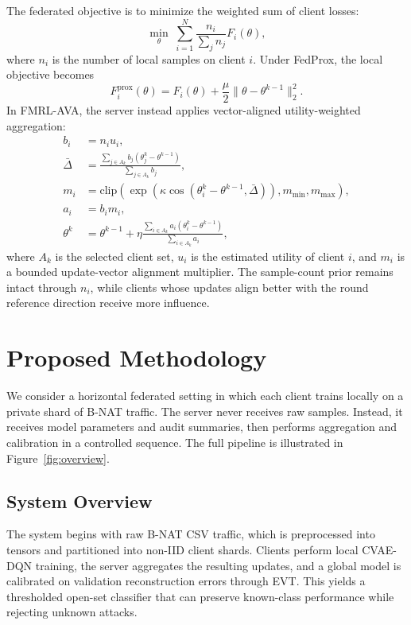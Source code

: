 \documentclass[10pt,twocolumn]{article}
\begin{document}
The federated objective is to minimize the weighted sum of client losses:
\[
\min_{\theta}\; \sum_{i=1}^{N} \frac{n_i}{\sum_j n_j} F_i(\theta),
\]
where $n_i$ is the number of local samples on client $i$. Under FedProx, the local objective becomes
\[
F_i^{\mathrm{prox}}(\theta) = F_i(\theta) + \frac{\mu}{2}\lVert \theta - \theta^{k-1}\rVert_2^2.
\]
In FMRL-AVA, the server instead applies vector-aligned utility-weighted aggregation:
\[
\begin{aligned}
b_i &= n_i u_i,\\
\bar{\Delta} &= \frac{\sum_{j \in A_k} b_j(\theta_j^k - \theta^{k-1})}{\sum_{j \in A_k} b_j},\\
m_i &= \mathrm{clip}\!\left(\exp(\kappa \cos(\theta_i^k-\theta^{k-1}, \bar{\Delta})), m_{\min}, m_{\max}\right),\\
a_i &= b_i m_i,\\
\theta^{k} &= \theta^{k-1} + \eta \frac{\sum_{i \in A_k} a_i(\theta_i^k - \theta^{k-1})}{\sum_{i \in A_k} a_i},
\end{aligned}
\]
where $A_k$ is the selected client set, $u_i$ is the estimated utility of client $i$, and $m_i$ is a bounded update-vector alignment multiplier. The sample-count prior remains intact through $n_i$, while clients whose updates align better with the round reference direction receive more influence.

\section{Proposed Methodology}
We consider a horizontal federated setting in which each client trains locally on a private shard of B-NAT traffic. The server never receives raw samples. Instead, it receives model parameters and audit summaries, then performs aggregation and calibration in a controlled sequence. The full pipeline is illustrated in Figure~\ref{fig:overview}.

\subsection{System Overview}
The system begins with raw B-NAT CSV traffic, which is preprocessed into tensors and partitioned into non-IID client shards. Clients perform local CVAE-DQN training, the server aggregates the resulting updates, and a global model is calibrated on validation reconstruction errors through EVT. This yields a thresholded open-set classifier that can preserve known-class performance while rejecting unknown attacks.
\end{document}
